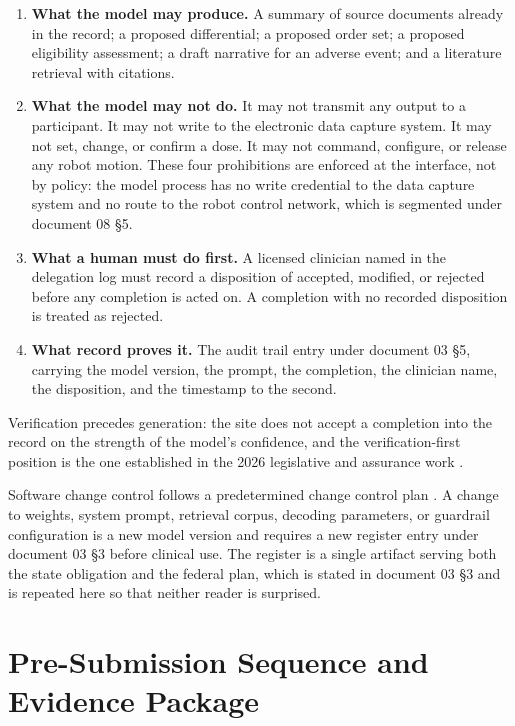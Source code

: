 \begin{enumerate}
\item \textbf{What the model may produce.} A summary of source documents already
  in the record; a proposed differential; a proposed order set; a proposed
  eligibility assessment; a draft narrative for an adverse event; and a
  literature retrieval with citations.

\item \textbf{What the model may not do.} It may not transmit any output to a
  participant. It may not write to the electronic data capture system. It may not
  set, change, or confirm a dose. It may not command, configure, or release any
  robot motion. These four prohibitions are enforced at the interface, not by
  policy: the model process has no write credential to the data capture system
  and no route to the robot control network, which is segmented under document
  08 §5.

\item \textbf{What a human must do first.} A licensed clinician named in the
  delegation log must record a disposition of accepted, modified, or rejected
  before any completion is acted on. A completion with no recorded disposition
  is treated as rejected.

\item \textbf{What record proves it.} The audit trail entry under document 03
  §5, carrying the model version, the prompt, the completion, the clinician
  name, the disposition, and the timestamp to the second.
\end{enumerate}

Verification precedes generation: the site does not accept a completion into the
record on the strength of the model's confidence, and the verification-first
position is the one established in the 2026 legislative and assurance work
\cite{vvuqbill,cliniciantrust}.

Software change control follows a predetermined change control plan
\cite{fdasamd}. A change to weights, system prompt, retrieval corpus, decoding
parameters, or guardrail configuration is a new model version and requires a new
register entry under document 03 §3 before clinical use. The register is a single
artifact serving both the state obligation and the federal plan, which is stated
in document 03 §3 and is repeated here so that neither reader is surprised.

\section{Pre-Submission Sequence and Evidence Package}

